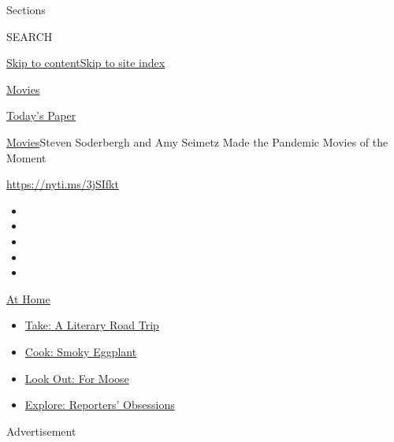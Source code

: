 Sections

SEARCH

\protect\hyperlink{site-content}{Skip to
content}\protect\hyperlink{site-index}{Skip to site index}

\href{https://www.nytimes.com/section/movies}{Movies}

\href{https://myaccount.nytimes.com/auth/login?response_type=cookie\&client_id=vi}{}

\href{https://www.nytimes.com/section/todayspaper}{Today's Paper}

\href{/section/movies}{Movies}\textbar{}Steven Soderbergh and Amy
Seimetz Made the Pandemic Movies of the Moment

\url{https://nyti.ms/3jSIfkt}

\begin{itemize}
\item
\item
\item
\item
\item
\end{itemize}

\href{https://www.nytimes.com/spotlight/at-home?action=click\&pgtype=Article\&state=default\&region=TOP_BANNER\&context=at_home_menu}{At
Home}

\begin{itemize}
\tightlist
\item
  \href{https://www.nytimes.com/2020/07/28/books/time-for-a-literary-road-trip.html?action=click\&pgtype=Article\&state=default\&region=TOP_BANNER\&context=at_home_menu}{Take:
  A Literary Road Trip}
\item
  \href{https://www.nytimes.com/2020/07/29/magazine/bored-with-your-home-cooking-some-smoky-eggplant-will-fix-that.html?action=click\&pgtype=Article\&state=default\&region=TOP_BANNER\&context=at_home_menu}{Cook:
  Smoky Eggplant}
\item
  \href{https://www.nytimes.com/2020/07/27/travel/moose-michigan-isle-royale.html?action=click\&pgtype=Article\&state=default\&region=TOP_BANNER\&context=at_home_menu}{Look
  Out: For Moose}
\item
  \href{https://www.nytimes.com/interactive/2020/at-home/even-more-reporters-editors-diaries-lists-recommendations.html?action=click\&pgtype=Article\&state=default\&region=TOP_BANNER\&context=at_home_menu}{Explore:
  Reporters' Obsessions}
\end{itemize}

Advertisement

